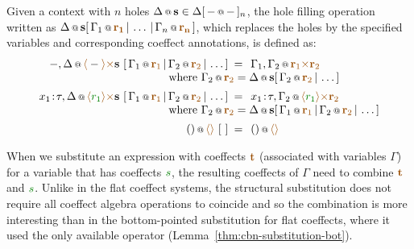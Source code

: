 \begin{definition} Given a context with $n$ holes $\coctx{\Delta}{\textbf{s}} \in
\Delta[\,\coctx{-}{-}\,]_n$, the hole filling operation written as
$\coctx{\Delta}{\textbf{s}}[\,\coctx{\Gamma_1}{\aclrd{\mathbf{r_1}}} \,|\, \ldots \,|\, \coctx{\Gamma_n}{\aclrd{\mathbf{r_n}}} \,]$,
which replaces the holes by the specified variables and corresponding coeffect annotations, is defined as:
%
\begin{equation*}
\begin{array}{rcl}
 \coctx{-, \Delta}{\alift{-} \atimes \textbf{s} }
    ~[\,\coctx{\Gamma_1}{\aclrd{\textbf{r}_1}} \,|\, \coctx{\Gamma_2}{\aclrd{\textbf{r}_2}} \,|\, \ldots \,] &\narrow{=}&
      \coctx{\Gamma_1, \Gamma_2}{\aclrd{\textbf{r}_1} \atimes \aclrd{\textbf{r}_2} } \\
 && \qquad \hspace{-9.3em} \textnormal{where}~\coctx{\Gamma_2}{\aclrd{\textbf{r}_2}} =
     \coctx{\Delta}{\textbf{s}}[\, \coctx{\Gamma_2}{\aclrd{\textbf{r}_2}} \,|\, \ldots \,]
\\[0.5em]
 \coctx{x_1\!:\!\tau, \Delta}{\alift{\cclrd{r_1}} \atimes \textbf{s} }
    ~[\,\coctx{\Gamma_1}{\aclrd{\textbf{r}_1}} \,|\, \coctx{\Gamma_2}{\aclrd{\textbf{r}_2}} \,|\, \ldots \,] &\narrow{=}&
      \coctx{x_1\!:\!\tau, \Gamma_2}{\alift{\cclrd{r_1}} \atimes \aclrd{\textbf{r}_2} } \\
 && \qquad \hspace{-9.3em} \textnormal{where}~\coctx{\Gamma_2}{\aclrd{\textbf{r}_2}} =
     \coctx{\Delta}{\textbf{s}}[\,\coctx{\Gamma_1}{\aclrd{\textbf{r}_1}} \,|\, \coctx{\Gamma_2}{\aclrd{\textbf{r}_2}} \,|\, \ldots \,]
\\[0.5em]
 \coctx{()}{\alift{}}~[~] &\narrow{=}& \coctx{()}{\alift{}}
\end{array}
\end{equation*}
\end{definition}

\noindent
When we substitute an expression with coeffects $\aclrd{\textbf{t}}$ (associated with variables $\Gamma$)
for a variable that has coeffects $\cclrd{s}$, the resulting coeffects of $\Gamma$ need to
combine $\aclrd{\textbf{t}}$ and $\cclrd{s}$. Unlike in the flat coeffect systems, the structural
substitution does not require all coeffect algebra operations to coincide and so the combination
is more interesting than in the bottom-pointed substitution for flat coeffects, where it used
the only available operator (Lemma~\ref{thm:cbn-substitution-bot}).

